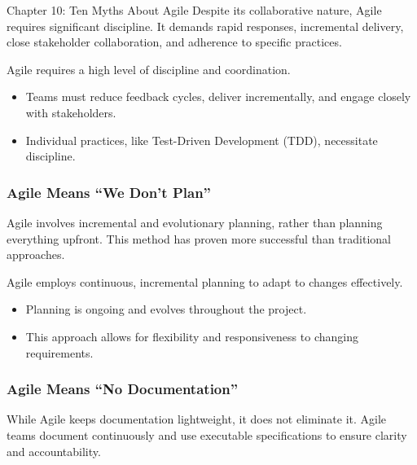 \begin{notes}{Chapter 10: Ten Myths About Agile}
    Despite its collaborative nature, Agile requires significant discipline. It demands rapid responses, incremental delivery, close stakeholder collaboration, and adherence to specific practices.
    
    \begin{highlight}
    
        Agile requires a high level of discipline and coordination.
        
        \begin{itemize}
            \item Teams must reduce feedback cycles, deliver incrementally, and engage closely with stakeholders.
            \item Individual practices, like Test-Driven Development (TDD), necessitate discipline.
        \end{itemize}
    
    \end{highlight}
    
    \subsubsection*{Agile Means “We Don't Plan”}
    
    Agile involves incremental and evolutionary planning, rather than planning everything upfront. This method has proven more successful than traditional approaches.
    
    \begin{highlight}
    
        Agile employs continuous, incremental planning to adapt to changes effectively.
        
        \begin{itemize}
            \item Planning is ongoing and evolves throughout the project.
            \item This approach allows for flexibility and responsiveness to changing requirements.
        \end{itemize}
    
    \end{highlight}
    
    \subsubsection*{Agile Means “No Documentation”}
    
    While Agile keeps documentation lightweight, it does not eliminate it. Agile teams document continuously and use executable specifications to ensure clarity and accountability.
    

\end{notes}

